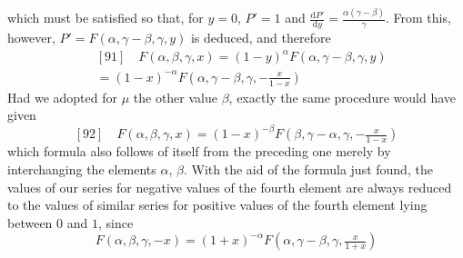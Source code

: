 which must be satisfied so that, for $y=0$, $P'=1$ and $\frac{\mathrm{d}P'}{\mathrm{d}y}=\frac{\alpha(\gamma-\beta)}{\gamma}$. From this, however, $P'=F(\alpha,\gamma-\beta,\gamma,y)$ is deduced, and therefore
\[
\begin{aligned}&[91]\quad F(\alpha,\beta,\gamma,x)=(1-y)^\alpha F(\alpha,\gamma-\beta,\gamma,y)\\&=(1-x)^{-\alpha}F(\alpha,\gamma-\beta,\gamma,-\tfrac{x}{1-x})\end{aligned}
\]
Had we adopted for $\mu$ the other value $\beta$, exactly the same procedure would have given
\[
[92]\quad F(\alpha,\beta,\gamma,x)=(1-x)^{-\beta}F(\beta,\gamma-\alpha,\gamma,-\tfrac{x}{1-x})
\]
which formula also follows of itself from the preceding one merely by interchanging the elements $\alpha$, $\beta$. With the aid of the formula just found, the values of our series for negative values of the fourth element are always reduced to the values of similar series for positive values of the fourth element lying between $0$ and $1$, since
\[
F(\alpha,\beta,\gamma,-x)=(1+x)^{-\alpha}F(\alpha,\gamma-\beta,\gamma,\tfrac{x}{1+x})
\]
